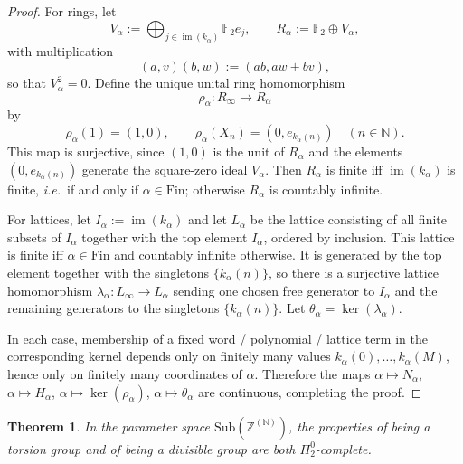 \documentclass[12pt,fleqn,a4paper]{amsart}
\numberwithin{equation}{section}
\newtheorem{theorem}{Theorem}[section]
\theoremstyle{definition}
\newcommand{\N}{\mathbb{N}}
\newcommand{\Z}{\mathbb{Z}}
\newcommand{\Sub}{\mathrm{Sub}}
\begin{document}
\begin{proof}
For rings, let
\[
V_\alpha:=\bigoplus_{j\in\operatorname{im}(k_\alpha)}\mathbb F_2 e_j,
\qquad
R_\alpha:=\mathbb F_2\oplus V_\alpha,
\]
with multiplication
\[
(a,v)(b,w):=(ab,aw+bv),
\]
so that $V_\alpha^2=0$.
Define the unique unital ring homomorphism
\[
\rho_\alpha:R_\infty\to R_\alpha
\]
by
\[
\rho_\alpha(1)=(1,0),
\qquad
\rho_\alpha(X_n)=(0,e_{k_\alpha(n)}) \quad (n\in\N).
\]
This map is surjective, since $(1,0)$ is the unit of $R_\alpha$ and the elements
$(0,e_{k_\alpha(n)})$ generate the square-zero ideal $V_\alpha$.
Then $R_\alpha$ is finite iff $\operatorname{im}(k_\alpha)$ is finite, \emph{i.e.}\ if and only if
$\alpha\in\mathrm{Fin}$; otherwise $R_\alpha$ is countably infinite.

For lattices, let $I_\alpha:=\operatorname{im}(k_\alpha)$ and let $L_\alpha$ be
the lattice consisting of all finite subsets of $I_\alpha$ together with the top
element $I_\alpha$, ordered by inclusion.  This lattice is finite iff
$\alpha\in\mathrm{Fin}$ and countably infinite otherwise.  It is generated by the
top element together with the singletons $\{k_\alpha(n)\}$, so there is a
surjective lattice homomorphism
$\lambda_\alpha:L_\infty\to L_\alpha$
sending one chosen free generator to $I_\alpha$ and the remaining generators to
the singletons $\{k_\alpha(n)\}$.  Let $\theta_\alpha=\ker(\lambda_\alpha)$.

In each case, membership of a fixed word / polynomial / lattice term in the
corresponding kernel depends only on finitely many values
$k_\alpha(0),\dots,k_\alpha(M)$, hence only on finitely many coordinates of
$\alpha$.  Therefore the maps
$\alpha\mapsto N_\alpha$, $\alpha\mapsto H_\alpha$,
$\alpha\mapsto \ker(\rho_\alpha)$, $\alpha\mapsto \theta_\alpha$
are continuous, completing the proof.
\end{proof}

\begin{theorem}\label{thm:torsion-divisible-pi2-complete}
In the parameter space $\Sub(\Z^{(\N)})$, the properties
of being a torsion group and of being a divisible group are
both $\Pi^0_2$-complete.
\end{theorem}
\end{document}
